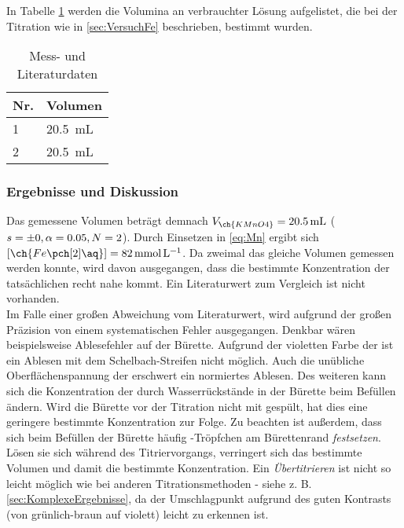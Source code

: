 \documentclass{article}
\begin{document}
        In Tabelle \ref{tab:MessdatenFe} werden die Volumina an verbrauchter  Lösung aufgelistet, die bei der Titration wie in \ref{sec:VersuchFe} beschrieben, bestimmt wurden. 
        
        \begin{table}[H]
          \centering
          \caption[Messdaten der Bestimmung der Konzentration einer Eisen(II)-Lösung, Quelle: Autor]{Mess- und Literaturdaten}
          \label{tab:MessdatenFe}
            \begin{tabular}{@{}l|l@{}}
              \toprule
               Nr. & Volumen \\ \midrule
               1 & \SI[mode=text]{20.5}{\milli\liter} \\
               2 & \SI[mode=text]{20.5}{\milli\liter}  \\ \bottomrule
            \end{tabular}
        \end{table} 
        
      \subsubsection{Ergebnisse und Diskussion} \label{sec:ErgebnisseMang} 
      
        Das gemessene Volumen beträgt demnach $V_{\ch{KMnO4}} = \SI[mode=text]{20.5}{\milli\liter}$ ($s = \num{\pm 0}, \alpha=0.05,N=2$). Durch Einsetzen in \eqref{eq:Mn} ergibt sich $[\ch{Fe\pch[2]\aq}] = \SI[mode=text]{82}{\milli\mole\per\liter}$. Da zweimal das gleiche Volumen gemessen werden konnte, wird davon ausgegangen, dass die bestimmte Konzentration der tatsächlichen recht nahe kommt. Ein Literaturwert zum Vergleich ist nicht vorhanden. \\
        
        Im Falle einer großen Abweichung vom Literaturwert, wird aufgrund der großen Präzision von einem systematischen Fehler ausgegangen. Denkbar wären beispielsweise Ablesefehler auf der Bürette. Aufgrund der violetten Farbe der  ist ein Ablesen mit dem Schelbach-Streifen nicht möglich. Auch die unübliche Oberflächenspannung der  erschwert ein normiertes Ablesen. Des weiteren kann sich die Konzentration der  durch Wasserrückstände in der Bürette beim Befüllen ändern. Wird die Bürette vor der Titration nicht mit  gespült, hat dies eine geringere bestimmte Konzentration zur Folge. Zu beachten ist außerdem, dass sich beim Befüllen der Bürette häufig -Tröpfchen am Bürettenrand \textit{festsetzen}. Lösen sie sich während des Titriervorgangs, verringert sich das bestimmte Volumen und damit die bestimmte Konzentration. Ein \textit{Übertitrieren} ist nicht so leicht möglich wie bei anderen Titrationsmethoden - siehe z. B. \ref{sec:KomplexeErgebnisse}, da der Umschlagpunkt aufgrund des guten Kontrasts (von grünlich-braun auf violett) leicht zu erkennen ist. \\
        
\end{document}
